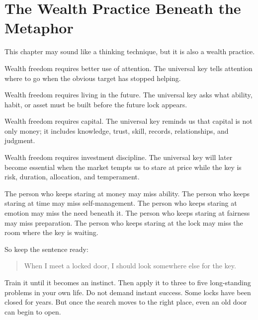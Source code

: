 \section*{The Wealth Practice Beneath the Metaphor}

This chapter may sound like a thinking technique, but it is also a wealth practice.

Wealth freedom requires better use of attention. The universal key tells attention where to go when the obvious target has stopped helping.

Wealth freedom requires living in the future. The universal key asks what ability, habit, or asset must be built before the future lock appears.

Wealth freedom requires capital. The universal key reminds us that capital is not only money; it includes knowledge, trust, skill, records, relationships, and judgment.

Wealth freedom requires investment discipline. The universal key will later become essential when the market tempts us to stare at price while the key is risk, duration, allocation, and temperament.

The person who keeps staring at money may miss ability. The person who keeps staring at time may miss self-management. The person who keeps staring at emotion may miss the need beneath it. The person who keeps staring at fairness may miss preparation. The person who keeps staring at the lock may miss the room where the key is waiting.

So keep the sentence ready:

\begin{quote}
When I meet a locked door, I should look somewhere else for the key.
\end{quote}

Train it until it becomes an instinct. Then apply it to three to five long-standing problems in your own life. Do not demand instant success. Some locks have been closed for years. But once the search moves to the right place, even an old door can begin to open.
